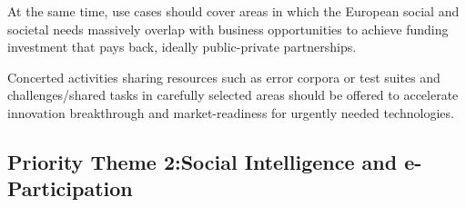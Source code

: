 \documentclass[10pt, plain]{../../metanetpaper}
\begin{document}
\begin{multicols}{2}

At the same time, use cases should cover areas in which the European social and societal needs massively overlap with business opportunities to achieve funding investment that pays back, ideally public-private partnerships.
 
Concerted activities sharing resources such as error corpora or test suites and challenges/shared tasks in carefully selected areas should be offered to accelerate innovation breakthrough and market-readiness for urgently needed technologies.

\subsection[Priority Theme 2: Social Intelligence and e-Participation]{Priority Theme 2:\newline Social Intelligence and e-Participation}
\label{sec:priority-theme-2-social-intelligence}

%
%
%
%
%
%


\end{multicols}
\end{document}
